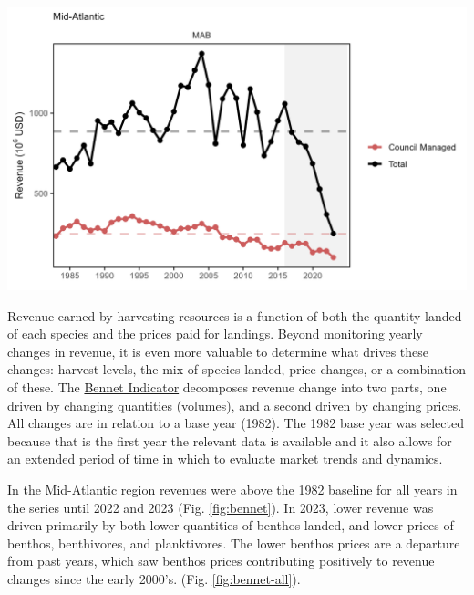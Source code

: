 \documentclass[
  10pt,
]{article}
\let\origfigure\figure
\let\endorigfigure\endfigure
\renewenvironment{figure}[1][2] {
    \expandafter\origfigure\expandafter[H]
} {
    \endorigfigure
}
\begin{document}
\begin{figure}

{\centering \includegraphics[width=6.5in]{images/MidAtlantic/comm_revenue_MidAtlantic_2025-09-05} 

}

\caption{Revenue for the for the Mid-Atlantic region: total (black) and from MAFMC managed species (red).}\label{fig:comm-revenue}
\end{figure}

Revenue earned by harvesting resources is a function of both the quantity landed of each species and the prices paid for landings. Beyond monitoring yearly changes in revenue, it is even more valuable to determine what drives these changes: harvest levels, the mix of species landed, price changes, or a combination of these. The \href{https://noaa-edab.github.io/catalog/bennet.html}{Bennet Indicator} decomposes revenue change into two parts, one driven by changing quantities (volumes), and a second driven by changing prices. All changes are in relation to a base year (1982). The 1982 base year was selected because that is the first year the relevant data is available and it also allows for an extended period of time in which to evaluate market trends and dynamics.

In the Mid-Atlantic region revenues were above the 1982 baseline for all years in the series until 2022 and 2023 (Fig. \ref{fig:bennet}). In 2023, lower revenue was driven primarily by both lower quantities of benthos landed, and lower prices of benthos, benthivores, and planktivores. The lower benthos prices are a departure from past years, which saw benthos prices contributing positively to revenue changes since the early 2000's. (Fig. \ref{fig:bennet-all}).
\end{document}
